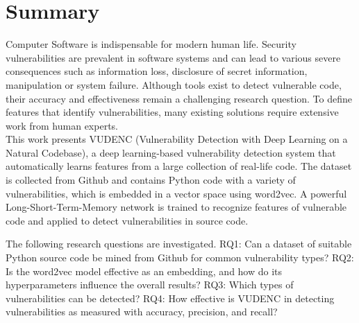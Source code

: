 \documentclass[
a4paper,
pagesize,
pdftex,
12pt,
twoside, %
BCOR=5mm, %
ngerman,
fleqn,
final,
]{scrartcl}
\begin{document}
	
	
	\mitverteidigung %
	\makeTitel
	\tableofcontents
	\newpage
	
	\section{Summary}
	Computer Software is indispensable for modern human life. Security vulnerabilities are prevalent in software systems and can lead to various severe consequences such as information loss, disclosure of secret information, manipulation or system failure. Although tools exist to detect vulnerable code, their accuracy and effectiveness remain a challenging research question. To define features that identify vulnerabilities, many existing solutions require extensive work from human experts.\\ %
	This work presents VUDENC (Vulnerability Detection with Deep Learning on a Natural Codebase), a deep learning-based vulnerability detection system that automatically learns features from a large collection of real-life code. The dataset is collected from Github and contains Python code with a variety of vulnerabilities, which is embedded in a vector space using word2vec. A powerful Long-Short-Term-Memory network is trained to recognize features of vulnerable code and applied to detect vulnerabilities in source code. 
	
	The following research questions are investigated. RQ1: Can a dataset of suitable Python source code be mined from Github for common vulnerability types? RQ2: Is the word2vec model effective as an embedding, and how do its hyperparameters influence the overall results? RQ3: Which types of vulnerabilities can be detected? RQ4: How effective is VUDENC in detecting vulnerabilities as measured with accuracy, precision, and recall? 
	
\end{document}
